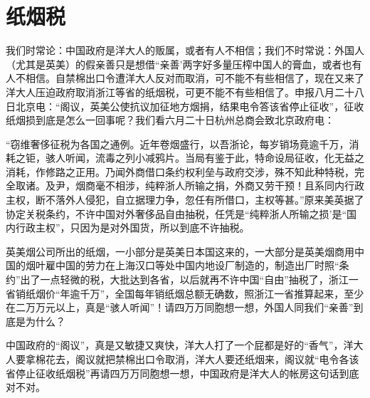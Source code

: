 \section{纸烟税}


我们时常论：中国政府是洋大人的贩属，或者有人不相信；我们不时常说：外国人（尤其是英美）的假亲善只是想借“亲善’两字好多量压榨中国人的膏血，或者也有人不相信。自禁棉出口令遭洋大人反对而取消，可不能不有些相信了，现在又来了洋大人压迫政府取消浙江等省的纸烟税，可更不能不有些相信了。申报八月二十八日北京电：“阁议，英美公使抗议加征地方烟捐，结果电令答该省停止征收”，征收纸烟损到底是怎么一回事呢？我们看六月二十日杭州总商会致北京政府电：

“窃维奢侈征税为各国之通例。近年卷烟盛行，以吾浙论，每岁销场竟逾千万，消耗之钜，骇人听闻，流毒之列小减鸦片。当局有鉴于此，特命设局征收，化无益之消耗，作修路之正用。乃闻外商借口条约权利垒与政府交涉，殊不知此种特税，完全取诸。及尹，烟商毫不相涉，纯粹浙人所输之捐，外商又劳干预！且系同内行政主权，断不落外人侵犯，自立据理力争，忽任有所借口，主权等甚。”原来美英据了协定关税条约，不许中国对外奢侈品自由抽税，任凭是“纯粹浙人所输之损’是“国内行政主权”，只因为是对外国货，所以到底不许抽税。

英美烟公司所出的纸烟，一小部分是英美日本国这来的，一大部分是英美烟商用中国的烟叶雇中国的劳力在上海汉口等处中国内地设厂制造的，制造出厂时照“条约”出了一点轻微的税，大批达到各省，以后就再不许中国“自由”抽税了，浙江一省销纸烟价“年逾千万”，全国每年销纸烟总额无确数，照浙江一省推算起来，至少在二万万元以上，真是“骇人听闻”！请四万万同胞想一想，外国人同我们“亲善”到底是为什么？

中国政府的“阁议”，真是又敏捷又爽快，洋大人打了一个屁都是好的“香气”，洋大人要拿棉花去，阁议就把禁棉出口令取消，洋大人要还纸烟来，阁议就“电令各该省停止征收纸烟税”再请四万万同胞想一想，中国政府是洋大人的帐房这句话到底对不对。

